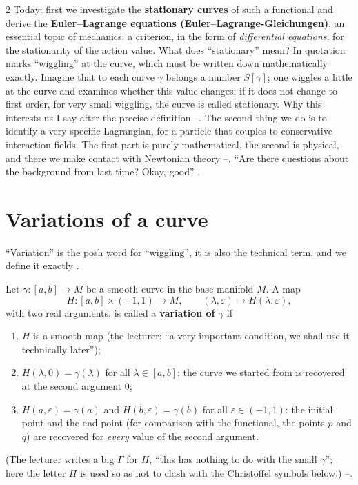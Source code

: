 \begin{paracol}{2}
Today: first we investigate the \textbf{stationary curves} of such a functional and derive the \textbf{Euler--Lagrange equations (Euler--Lagrange-Gleichungen)}, an essential topic of mechanics: a criterion, in the form of \emph{differential equations}, for the stationarity of the action value. What does ``stationary'' mean? In quotation marks ``wiggling'' at the curve, which must be written down mathematically exactly. Imagine that to each curve $\gamma$ belongs a number $S[\gamma]$; one wiggles a little at the curve and examines whether this value changes; if it does not change to first order, for very small wiggling, the curve is called stationary. Why this interests us I say after the precise definition --.
The second thing we do is to identify a very specific Lagrangian, for a particle that couples to conservative interaction fields. The first part is purely mathematical, the second is physical, and there we make contact with Newtonian theory --. ``Are there questions about the background from last time? Okay, good'' .

\section{Variations of a curve}\label{sec:var-variation}

``Variation'' is the posh word for ``wiggling'', it is also the technical term, and we define it exactly .

\begin{definition}\label{def:var-variation}
Let $\gamma\colon[a,b]\to M$ be a smooth curve in the base manifold $M$. A map
\begin{equation}\label{eq:var-H}
  H\colon[a,b]\times(-1,1)\to M,\qquad(\lambda,\varepsilon)\mapsto H(\lambda,\varepsilon),
\end{equation}
with two real arguments, is called a \textbf{variation of $\gamma$} if
\begin{enumerate}
  \item $H$ is a smooth map (the lecturer: ``a very important condition, we shall use it technically later'');
  \item $H(\lambda,0)=\gamma(\lambda)$ for all $\lambda\in[a,b]$: the curve we started from is recovered at the second argument $0$;
  \item $H(a,\varepsilon)=\gamma(a)$ and $H(b,\varepsilon)=\gamma(b)$ for all $\varepsilon\in(-1,1)$: the initial point and the end point (for comparison with the functional, the points $p$ and $q$) are recovered for \emph{every} value of the second argument.
\end{enumerate}
(The lecturer writes a big $\Gamma$ for $H$, ``this has nothing to do with the small $\gamma$''; here the letter $H$ is used so as not to clash with the Christoffel symbols below.) --.
\end{definition}


\end{paracol}
